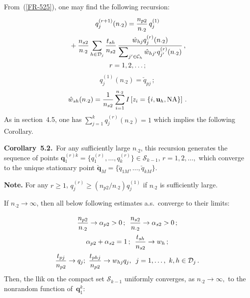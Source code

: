 \begin{multicols}{2}
\noindent
From~(\ref{FR-525}), one may find the following recursion:
\begin{multline}
\label{FR-531}
   q_j^{(r+1)} (n_{\cdot 2}) =\displaystyle\frac{\displaystyle n_{p 2}\mathstrut}{\displaystyle n_{\cdot 2}\mathstrut}\,q_j^{(1)}\\
{}+  \displaystyle\frac{\displaystyle n_{s 2}\mathstrut}{\displaystyle n_{\cdot 2}\mathstrut}  \sum\limits_{h\in\mathcal{D}_j}
  \displaystyle\frac{\displaystyle t_{s h}\mathstrut}{\displaystyle n_{s 2}\mathstrut} \, \displaystyle\frac{\displaystyle \hat{w}_{hj} q_j^{(r)}(n_{\cdot 2})\mathstrut}{\displaystyle \sum\nolimits_{j'\in\mathcal{C}_h}\hat{w}_{hj'}q_{j'}^{(r)}(n_{\cdot 2})\mathstrut}\,,\\
r=  1, 2, \ldots ;
\end{multline}
 \begin{equation}\label{FR-56a}
  q_j^{(1)}(n_{\cdot 2}) =\check q_{pj}\,;
  \end{equation}
$$
\hat {w}_{sh}(n_{\cdot 2})=\displaystyle\frac{\displaystyle 1\mathstrut}{\displaystyle n_{s2}\mathstrut}
   \sum\limits_{i=1}^{n_{\cdot 2}} I \left[z_i =\left\{  i,
   \mathbf{u}_{h}, \mathrm{NA}\right\}\right]\,.
$$
   As in section~4.5, one has $\sum_{j=1}^k q_j^{(r)} (n_{\cdot 2})=1$ which
   implies the following Corollary.
   
   \smallskip
   
   \noindent
   \textbf{Corollary~5.2.}\
   For any sufficiently large $n_{\cdot 2}$, this
recursion  generates the sequence of points $\mathbf{q}_1^{(r)k}$\linebreak $=\{
q_1^{(r)}, \ldots, q_k^{(r)} \} \in \mathcal{S}_{k-1}$, $r= 1, 2, \ldots, $ which
converge to the unique  stationary point $\check{\mathbf{q}}_{M}= \{
\check{q}_{1M}, \ldots, \check{q}_{kM}\}$.


\smallskip


\noindent
\textbf{Note.} For any $r\ge 1$, $ q_j^{(r)} \ge ({n_{p2}}/{n_{\cdot 2}})q_j^{(1)}$
if $n_{\cdot 2}$ is sufficiently large.

If $n_{\cdot 2}\to\infty$, then all below following estimates a.s.\
 converge to their limits:
 
 \noindent
\begin{gather*}
 \displaystyle\frac{\displaystyle n_{p2}\mathstrut}{\displaystyle n_{\cdot 2}\mathstrut}\to \alpha_{p2}>0\,; \enskip
  \displaystyle\frac{\displaystyle n_{s2}\mathstrut}{\displaystyle n_{\cdot 2}\mathstrut}\to \alpha_{s2}>0\,; \\
 \alpha_{p2}+\alpha_{s2}=1\,;\enskip
\displaystyle\frac{\displaystyle t_{sh}\mathstrut}{\displaystyle n_{s 2}\mathstrut}\to w_{h}\,; \\
\displaystyle\frac{\displaystyle t_{pj}\mathstrut}{\displaystyle n_{p 2}\mathstrut}\to q_{j}; \
 \displaystyle\frac{\displaystyle t_{phj}\mathstrut}{\displaystyle n_{p 2}\mathstrut}\to w_{hj} q_{j},\enskip
 j=1, \ldots,\ k, h \in\mathcal{D}_j\,.
\end{gather*}
 Then, the llik
 on the compact set $\mathcal{S}_{k-1}$ uniformly converges, as
  $n_{\cdot 2}\to\infty ,$ to the nonrandom
 function of~$\mathbf{q}_1^k$:
 

\end{multicols}
